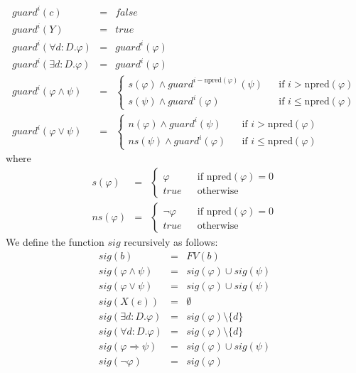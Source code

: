\begin{equation*}
\begin{array}{lll}
guard^{i}(c) & = & false \\ 
guard^{i}(Y) & = & true \\ 
guard^{i}(\forall d:D.\varphi ) & = & guard^{i}(\varphi ) \\ 
guard^{i}(\exists d:D.\varphi ) & = & guard^{i}(\varphi ) \\ 
guard^{i}(\varphi \wedge \psi ) & = & \left\{ 
\begin{array}{lll}
s(\varphi )\wedge guard^{i-\mathrm{npred}(\varphi )}(\psi ) &  & \text{if }i>%
\mathrm{npred}(\varphi ) \\ 
s(\psi )\wedge guard^{i}(\varphi ) &  & \text{if }i\leq \mathrm{npred}%
(\varphi )%
\end{array}%
\right. \\ 
guard^{i}(\varphi \vee \psi ) & = & \left\{ 
\begin{array}{lll}
n(\varphi )\wedge guard^{i}(\psi ) &  & \text{if }i>\mathrm{npred}(\varphi )
\\ 
ns(\psi )\wedge guard^{i}(\varphi ) &  & \text{if }i\leq \mathrm{npred}%
(\varphi )%
\end{array}%
\right.%
\end{array}%
\end{equation*}%
where%
\begin{equation*}
\begin{array}{lll}
s(\varphi ) & = & \left\{ 
\begin{array}{lll}
\varphi &  & \text{if }\mathrm{npred}(\varphi )=0 \\ 
true &  & \text{otherwise}%
\end{array}%
\right. \\ 
ns(\varphi ) & = & \left\{ 
\begin{array}{lll}
\lnot \varphi &  & \text{if }\mathrm{npred}(\varphi )=0 \\ 
true &  & \text{otherwise}%
\end{array}%
\right.%
\end{array}%
\end{equation*}%
We define the function $sig$ recursively as follows:%
\begin{equation*}
\begin{array}{lll}
sig(b) & = & FV(b) \\ 
sig(\varphi \wedge \psi ) & = & sig(\varphi )\cup sig(\psi ) \\ 
sig(\varphi \vee \psi ) & = & sig(\varphi )\cup sig(\psi ) \\ 
sig(X(e)) & = & \emptyset \\ 
sig(\exists d:D.\varphi ) & = & sig(\varphi )\setminus \{d\} \\ 
sig(\forall d:D.\varphi ) & = & sig(\varphi )\setminus \{d\} \\ 
sig(\varphi \Rightarrow \psi ) & = & sig(\varphi )\cup sig(\psi ) \\ 
sig(\lnot \varphi ) & = & sig(\varphi )%
\end{array}%
\end{equation*}

